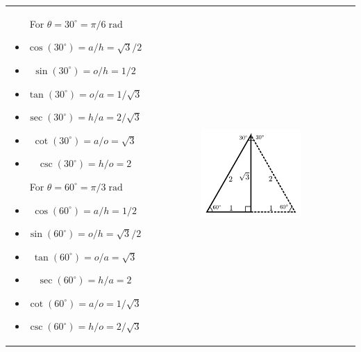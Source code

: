 \documentclass{article}
\newcommand{\dr}[1]{\textcolor{dark_red}{#1}}
\newcommand{\dg}[1]{\textcolor{dark_green}{#1}}
\newcommand{\db}[1]{\textcolor{dark_blue}{#1}}
\begin{document}
\begin{tabular}{cc}
\parbox{0.3\textwidth}{
For \(\theta = 30^\circ = \pi/6\;\text{rad}\)
\begin{itemize}
\item \dr{\(\cos(30^\circ) = a/h = \sqrt{3}/2\)}
\item \dr{\(\sin(30^\circ) = o/h = 1/2\)}
\item \dg{\(\tan(30^\circ) = o/a = 1/\sqrt{3}\)}
\item \dg{\(\sec(30^\circ) = h/a = 2/\sqrt{3}\)}
\item \db{\(\cot(30^\circ) = a/o = \sqrt{3}\)}
\item \db{\(\csc(30^\circ) = h/o = 2\)}
\end{itemize}
For \(\theta = 60^\circ = \pi/3\;\text{rad}\)
\begin{itemize}
\item \dr{\(\cos(60^\circ) = a/h = 1/2\)}
\item \dr{\(\sin(60^\circ) = o/h = \sqrt{3}/2\)}
\item \dg{\(\tan(60^\circ) = o/a = \sqrt{3}\)}
\item \dg{\(\sec(60^\circ) = h/a = 2\)}
\item \db{\(\cot(60^\circ) = a/o = 1/\sqrt{3}\)}
\item \db{\(\csc(60^\circ) = h/o = 2/\sqrt{3}\)}
\end{itemize}
} & \parbox{0.5\textwidth}{
\includegraphics[width = 0.5\textwidth]{30_60_90_triangle}
}
\end{tabular}
\end{document}
